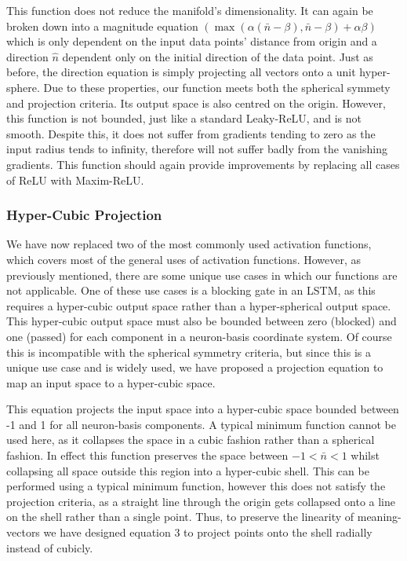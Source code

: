 \documentclass[onecolumn]{article}
\begin{document}
   This function does not reduce the manifold's dimensionality. It can again be broken down into a magnitude equation $\left(\max\left(\alpha\left(\bar{n}-\beta\right),\bar{n}-\beta\right)+\alpha\beta\right)$ which is only dependent on the input data points' distance from origin and a direction $\hat{n}$ dependent only on the initial direction of the data point. Just as before, the direction equation is simply projecting all vectors onto a unit hyper-sphere. Due to these properties, our function meets both the spherical symmety and projection criteria. Its output space is also centred on the origin. However, this function is not bounded, just like a standard Leaky-ReLU, and is not smooth. Despite this, it does not suffer from gradients tending to zero as the input radius tends to infinity, therefore will not suffer badly from the vanishing gradients. This function should again provide improvements by replacing all cases of ReLU with Maxim-ReLU.
    
    \subsubsection{Hyper-Cubic Projection}
    
    We have now replaced two of the most commonly used activation functions, which covers most of the general uses of activation functions. However, as previously mentioned, there are some unique use cases in which our functions are not applicable. One of these use cases is a blocking gate in an LSTM, as this requires a hyper-cubic output space rather than a hyper-spherical output space. This hyper-cubic output space must also be bounded between zero (blocked) and one (passed) for each component in a neuron-basis coordinate system. Of course this is incompatible with the spherical symmetry criteria, but since this is a unique use case and is widely used, we have proposed a projection equation to map an input space to a hyper-cubic space.

    This equation projects the input space into a hyper-cubic space bounded between -1 and 1 for all neuron-basis components. A typical minimum function cannot be used here, as it collapses the space in a cubic fashion rather than a spherical fashion. In effect this function preserves the space between $-1<\bar{n}<1$ whilst collapsing all space outside this region into a hyper-cubic shell. This can be performed using a typical minimum function, however this does not satisfy the projection criteria, as a straight line through the origin gets collapsed onto a line on the shell rather than a single point. Thus, to preserve the linearity of meaning-vectors we have designed equation 3 to project points onto the shell radially instead of cubicly.
\end{document}

